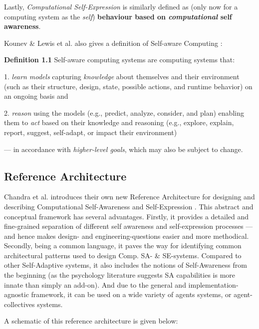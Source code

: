 	Lastly, \textit{Computational Self-Expression} is similarly defined as  (only now for a computing system as the \textit{self}) \textbf{behaviour based on \textit{computational} self awareness}.
	\newline

	Kounev \& Lewis et al. also gives a definition of Self-aware Computing \cite{sacs17_ch1}:

	\textbf{Definition 1.1} Self-aware computing systems are computing systems that:

	1. \textit{learn models} capturing \textit{knowledge} about themselves and their environment (such as their structure, design, state, possible actions, and runtime behavior) on an ongoing basis and

	2. \textit{reason} using the models (e.g., predict, analyze, consider, and plan) enabling them to \textit{act} based on their knowledge and reasoning (e.g., explore, explain, report, suggest, self-adapt, or impact their environment)

	— in accordance with \textit{higher-level goals}, which may also be subject to change.


	\subsection{Reference Architecture}

	Chandra et al. introduces their own new Reference Architecture for designing and describing Computational Self-Awareness and Self-Expression \cite{sacs16_ch4}. This abstract and conceptual framework has several advantages. Firstly, it provides a detailed and fine-grained separation of different self awareness and self-expression processes — and hence makes design- and engineering-questions easier and more methodical. Secondly, being a common language, it paves the way for identifying common architectural patterns used to design Comp. SA- \& SE-systems. Compared to other Self-Adaptive systems, it also includes the notions of Self-Awareness from the beginning (as the psychology literature suggests SA capabilities is more innate than simply an add-on). And due to the general and implementation-agnostic framework, it can be used on a wide variety of agents systems, or agent-collectives systems.

	A schematic of this reference architecture is given below:

